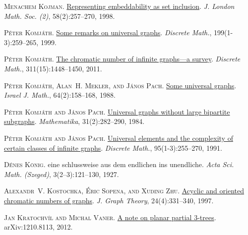\documentclass[a4paper,11pt]{article}
\theoremstyle{plain}
\theoremstyle{definition}
\begin{document}
\textsc{Menachem Kojman}.
\newblock \href{https://doi.org/10.1112/S0024610798006668}{Representing
  embeddability as set inclusion}.
\newblock \emph{J. London Math. Soc. (2)}, 58(2):257--270, 1998.

\textsc{P\'{e}ter Komj\'{a}th}.
\newblock \href{https://doi.org/10.1016/S0012-365X(98)00339-2}{Some remarks on
  universal graphs}.
\newblock \emph{Discrete Math.}, 199(1-3):259--265, 1999.

\textsc{P\'{e}ter Komj\'{a}th}.
\newblock \href{https://doi.org/10.1016/j.disc.2010.11.004}{The chromatic
  number of infinite graphs---a survey}.
\newblock \emph{Discrete Math.}, 311(15):1448--1450, 2011.

\textsc{P\'{e}ter Komj\'{a}th, Alan~H. Mekler, and J\'{a}nos Pach}.
\newblock \href{https://doi.org/10.1007/BF02787220}{Some universal graphs}.
\newblock \emph{Israel J. Math.}, 64(2):158--168, 1988.

\textsc{P\'{e}ter Komj\'{a}th and J\'{a}nos Pach}.
\newblock \href{https://doi.org/10.1112/S002557930001250X}{Universal graphs
  without large bipartite subgraphs}.
\newblock \emph{Mathematika}, 31(2):282--290, 1984.

\textsc{P\'{e}ter Komj\'{a}th and J\'{a}nos Pach}.
\newblock \href{https://doi.org/10.1016/0012-365X(91)90340-8}{Universal
  elements and the complexity of certain classes of infinite graphs}.
\newblock \emph{Discrete Math.}, 95(1-3):255--270, 1991.

\textsc{D\'enes K\"onig}.
 eine schlussweise aus dem endlichen ins unendliche.
\newblock \emph{Acta Sci. Math. (Szeged)}, 3(2--3):121--130, 1927.

\textsc{Alexandr~V. Kostochka, \'Eric Sopena, and Xuding Zhu}.
\newblock
  \href{https://doi.org/10.1002/(SICI)1097-0118(199704)24:4<331::AID-JGT5>3.0.CO;2-P}{Acyclic
  and oriented chromatic numbers of graphs}.
\newblock \emph{J. Graph Theory}, 24(4):331--340, 1997.

\textsc{Jan Kratochv{\'{\i}}l and Michal Vaner}.
\newblock \href{http://arxiv.org/abs/1210.8113}{A note on planar partial
  3-trees}.
\newblock arXiv:1210.8113, 2012.
\end{document}
